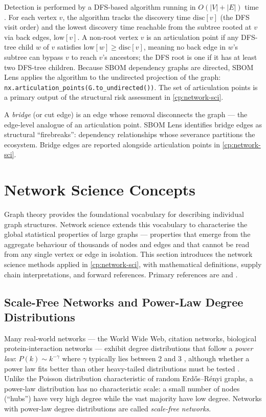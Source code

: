 Detection is performed by a DFS-based algorithm running in \(O(|V| + |E|)\) time \citep{CLRS4th}. For each vertex \(v\), the algorithm tracks the discovery time \(\mathrm{disc}[v]\) (the DFS visit order) and the lowest discovery time reachable from the subtree rooted at \(v\) via back edges, \(\mathrm{low}[v]\). A non-root vertex \(v\) is an articulation point if any DFS-tree child \(w\) of \(v\) satisfies \(\mathrm{low}[w] \geq \mathrm{disc}[v]\), meaning no back edge in \(w\)'s subtree can bypass \(v\) to reach \(v\)'s ancestors; the DFS root is one if it has at least two DFS-tree children. Because SBOM dependency graphs are directed, SBOM Lens applies the algorithm to the undirected projection of the graph: \texttt{nx.articulation\_points(G.to\_undirected())}. The set of articulation points is a primary output of the structural risk assessment in \autoref{cp:network-sci}.

A \textit{bridge} (or cut edge) is an edge whose removal disconnects the graph --- the edge-level analogue of an articulation point. SBOM Lens identifies bridge edges as structural ``firebreaks'': dependency relationships whose severance partitions the ecosystem. Bridge edges are reported alongside articulation points in \autoref{cp:network-sci}.


\section{Network Science Concepts}
\label{sec:network-science}

Graph theory provides the foundational vocabulary for describing individual graph structures. Network science extends this vocabulary to characterise the global statistical properties of large graphs --- properties that emerge from the aggregate behaviour of thousands of nodes and edges and that cannot be read from any single vertex or edge in isolation. This section introduces the network science methods applied in \autoref{cp:network-sci}, with mathematical definitions, supply chain interpretations, and forward references. Primary references are \citet{Barabasi2016} and \citet{Newman2018}.


\subsection{Scale-Free Networks and Power-Law Degree Distributions}
\label{sec:scale-free}

Many real-world networks --- the World Wide Web, citation networks, biological protein-interaction networks --- exhibit degree distributions that follow a \textit{power law}: \(P(k) \sim k^{-\gamma}\) where \(\gamma\) typically lies between 2 and 3 \citep{Barabasi2016}, although whether a power law fits better than other heavy-tailed distributions must be tested \citep{Clauset2009}. Unlike the Poisson distribution characteristic of random Erdős--Rényi graphs, a power-law distribution has no characteristic scale: a small number of nodes (``hubs'') have very high degree while the vast majority have low degree. Networks with power-law degree distributions are called \textit{scale-free networks}.

